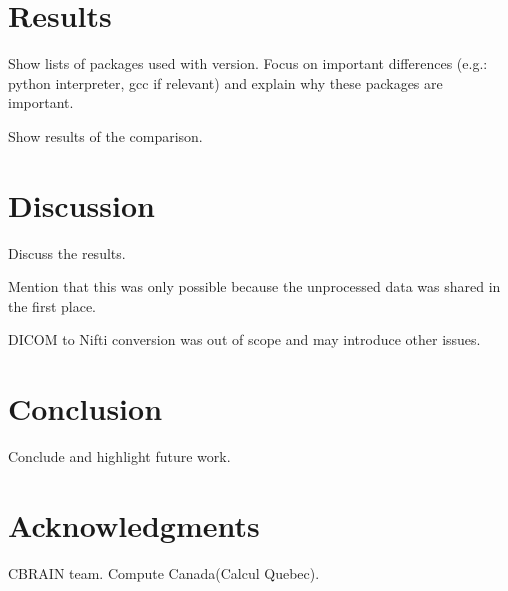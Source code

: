 \documentclass{article}
\begin{document}
\section{Results}

Show lists of packages used with version. Focus on important
differences (e.g.: python interpreter, gcc if relevant) and explain
why these packages are important.

Show results of the comparison.

\section{Discussion}

Discuss the results.

Mention that this was only possible because the unprocessed data was shared in the first place.

DICOM to Nifti conversion was out of scope and may introduce other issues.

\section{Conclusion}

Conclude and highlight future work.

\section{Acknowledgments}

CBRAIN team. Compute Canada(Calcul Quebec).



\end{document}
